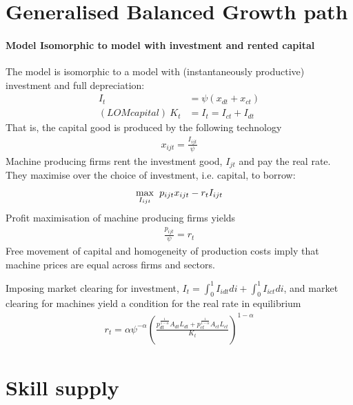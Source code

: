 \section{Generalised Balanced Growth path}

\paragraph{Model Isomorphic to model with investment and rented capital}
The model is isomorphic to a model with (instantaneously productive) investment and full depreciation: 
\begin{align*}
I_t&=\psi(x_{dt}+x_{ct})\\
(LOM capital) \ K_t&=I_t= I_{ct}+I_{dt}
\end{align*}
That is, the capital good is produced by the following technology
\begin{align*}
x_{ijt}=\frac{I_{ijt}}{\psi}
\end{align*}
Machine producing firms rent the investment good, $I_{jt}$ and pay the real rate. They maximise over the choice of investment, i.e. capital, to borrow:
\begin{align*}
\underset{I_{ijt}}{\max}\hspace{2mm}p_{ijt}x_{ijt}-r_tI_{ijt}
\end{align*}
Profit maximisation of machine producing firms yields
\begin{align*}
\frac{p_{ijt}}{\psi}=r_t
\end{align*}
Free movement of capital and homogeneity of production costs imply that machine prices are equal across firms and sectors. 

Imposing market clearing for investment, $I_t=\int_{0}^{1}I_{idt}di+\int_{0}^{1}I_{ict}di$, and market clearing for machines yield a condition for the real rate in equilibrium
\begin{align*}
r_t=\alpha \psi^{-\alpha}\left(\frac{p_{dt}^{\frac{1}{1-\alpha}}A_{dt}L_{dt}+p_{ct}^{\frac{1}{1-\alpha}}A_{ct}L_{ct}}{K_t}\right)^{1-\alpha}
\end{align*}

\section{Skill supply}

